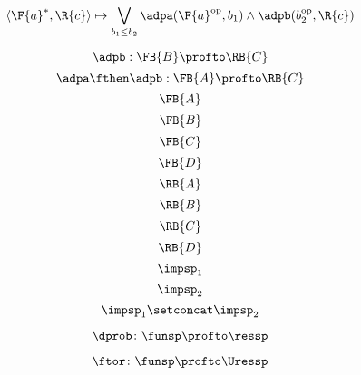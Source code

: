 {\begin{forslides}
\begin{equation}\label{eq:adp12pfexpr}
\langle\F{a}^*, \R{c}\rangle \mapsto \bigvee_{b_1\leq b_2} \adpa(\F{a}^{\text{op}}, b_1) \wedge \adpb(b_2^{\text{op}}, \R{c})
\end{equation}

\begin{equation}\label{eq:adp2}
\adpb: \FB{B} \profto  \RB{C}
\end{equation}
\begin{equation}\label{eq:adp1adp2}
\adpa\fthen\adpb: \FB{A} \profto  \RB{C}
\end{equation}
\begin{equation}\label{eq:FA}
\FB{A}
\end{equation}
\begin{equation}\label{eq:FB}
\FB{B}
\end{equation}
\begin{equation}\label{eq:FC}
\FB{C}
\end{equation}
\begin{equation}\label{eq:FD}
\FB{D}
\end{equation}
\begin{equation}\label{eq:RA}
\RB{A}
\end{equation}
\begin{equation}\label{eq:RB}
\RB{B}
\end{equation}
\begin{equation}\label{eq:RC}
\RB{C}
\end{equation}
\begin{equation}\label{eq:RD}
\RB{D}
\end{equation}
  \begin{equation}
  \label{eq:impsp1}
  \impsp_1
\end{equation}
\begin{equation}
  \label{eq:impsp2}
  \impsp_2
\end{equation}
\begin{equation}\label{eq:impsp12}
\impsp_{1} \setconcat \impsp_{2}
\end{equation}
\end{forslides}

\begin{forslides}
\begin{equation}\label{eq:dproba}
  \dprob \colon \funsp \profto \ressp
\end{equation}

\begin{equation}\label{eq:dprob2}
  \ftor \colon \funsp \profto \Uressp
\end{equation}
\end{forslides}
}

